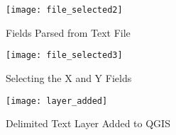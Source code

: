 \begin{figure}[ht]
   \begin{center}
   \caption{Fields Parsed from Text
File}\label{fig:delim_text_file_selected2}\smallskip  
\texttt{[image: file\_selected2]}
   \end{center}  
\end{figure}

\begin{figure}[ht]
   \begin{center}
   \caption{Selecting the X and Y
Fields}\label{fig:delim_text_file_selected3}\smallskip
\texttt{[image: file\_selected3]}
   \end{center}  
\end{figure}

\begin{figure}[ht]
   \begin{center}
   \caption{Delimited Text Layer Added to
QGIS}\label{fig:layer_added}\smallskip
\texttt{[image: layer\_added]}
   \end{center}  
\end{figure}


